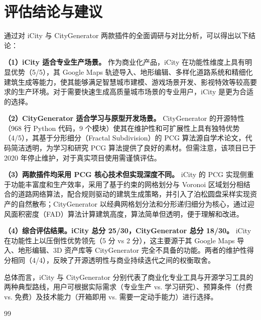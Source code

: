 \documentclass[UTF8,a4paper,10pt]{ctexart}
\begin{document}
\section{评估结论与建议}

通过对 iCity 与 CityGenerator 两款插件的全面调研与对比分析，可以得出以下结论：

\textbf{（1）iCity 适合专业生产场景。} 作为商业化产品，iCity 在功能性维度上具有明显优势（5/5），其 Google Maps 轨迹导入、地形编辑、多样化道路系统和精细化建筑生成等能力，使其能够满足智慧城市建模、游戏场景开发、影视特效等较高要求的生产环境。对于需要快速生成高质量城市场景的专业用户，iCity 是更为合适的选择。

\textbf{（2）CityGenerator 适合学习与原型开发场景。} CityGenerator 的开源特性（968 行 Python 代码，9 个模块）使其在维护性和可扩展性上具有独特优势（4/5），其基于分形细分（Fractal Subdivision）的 PCG 算法源自学术论文，代码简洁透明，为学习和研究 PCG 算法提供了良好的素材。但需注意，该项目已于 2020 年停止维护，对于真实项目使用需谨慎评估。

\textbf{（3）两款插件均采用 PCG 核心技术但实现深度不同。} iCity 的 PCG 实现侧重于功能丰富度和生产效率，采用了基于约束的网格划分与 Voronoi 区域划分相结合的道路网络算法，配合规则驱动的建筑生成策略，并引入了泊松圆盘采样实现资产的自然散布；CityGenerator 以经典网格划分法和分形递归细分为核心，通过迎风面积密度（FAD）算法计算建筑高度，算法简单但透明，便于理解和改进。

\textbf{（4）综合评估结果。iCity 总分 25/30，CityGenerator 总分 18/30。} iCity 在功能性上以压倒性优势领先（5 分 vs 2 分），这主要源于其 Google Maps 导入、地形编辑、3D 资产库等 CityGenerator 完全不具备的功能。两者的维护性得分相同（4/4），反映了开源透明性与商业持续迭代之间的权衡取舍。

总体而言，iCity 与 CityGenerator 分别代表了商业化专业工具与开源学习工具的两种典型路线，用户可根据实际需求（专业生产 vs. 学习研究）、预算条件（付费 vs. 免费）及技术能力（开箱即用 vs. 需要一定动手能力）进行选择。

\newpage
{}

\vspace{2em}
\begin{thebibliography}{99}
\end{thebibliography}
\end{document}
